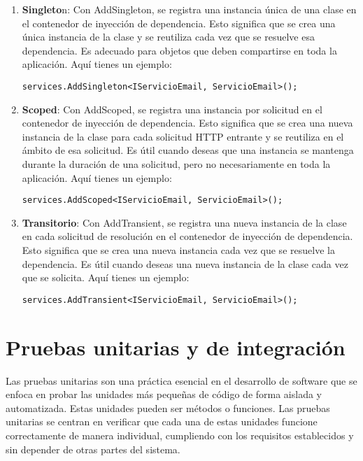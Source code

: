 \documentclass[executivepaper]{article}
\begin{document}
\begin{enumerate}
    \item \textbf{Singleto}n: Con AddSingleton, se registra una instancia única de una clase en el contenedor de inyección de dependencia. Esto significa que se crea una única instancia de la clase y se reutiliza cada vez que se resuelve esa dependencia. Es adecuado para objetos que deben compartirse en toda la aplicación. Aquí tienes un ejemplo:
    \begin{lstlisting}
services.AddSingleton<IServicioEmail, ServicioEmail>();
\end{lstlisting}
    \item \textbf{Scoped}: Con AddScoped, se registra una instancia por solicitud en el contenedor de inyección de dependencia. Esto significa que se crea una nueva instancia de la clase para cada solicitud HTTP entrante y se reutiliza en el ámbito de esa solicitud. Es útil cuando deseas que una instancia se mantenga durante la duración de una solicitud, pero no necesariamente en toda la aplicación. Aquí tienes un ejemplo:
    \begin{lstlisting}
services.AddScoped<IServicioEmail, ServicioEmail>();
\end{lstlisting}
    \item \textbf{Transitorio}: Con AddTransient, se registra una nueva instancia de la clase en cada solicitud de resolución en el contenedor de inyección de dependencia. Esto significa que se crea una nueva instancia cada vez que se resuelve la dependencia. Es útil cuando deseas una nueva instancia de la clase cada vez que se solicita. Aquí tienes un ejemplo:
    \begin{lstlisting}
services.AddTransient<IServicioEmail, ServicioEmail>();
\end{lstlisting}
\end{enumerate}

\section{Pruebas unitarias y de integración}
Las pruebas unitarias son una práctica esencial en el desarrollo de software que se enfoca en probar las unidades más pequeñas de código de forma aislada y automatizada. Estas unidades pueden ser métodos o funciones. Las pruebas unitarias se centran en verificar que cada una de estas unidades funcione correctamente de manera individual, cumpliendo con los requisitos establecidos y sin depender de otras partes del sistema.
\end{document}
